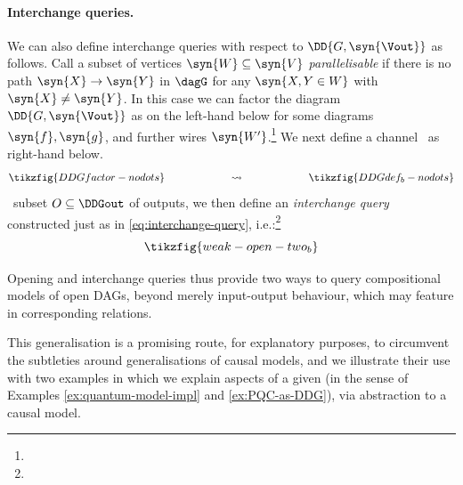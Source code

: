 \documentclass{article}
\begin{document}
\paragraph{Interchange queries.}

We can also define interchange queries with respect to $\DD{G,\syn{\Vout}}$ as follows. Call a subset of vertices $\syn{W} \subseteq \syn{V}$ \emph{parallelisable} if there is no path $\syn{X} \to \syn{Y}$ in $\dagG$ for any $\syn{X, Y \in W}$ with $\syn{X} \neq \syn{Y}$. In this case we can factor the diagram $\DD{G,\syn{\Vout}}$ as on the left-hand below for some diagrams $\syn{f}, \syn{g}$, and further wires $\syn{W'}$.\footnote{} We next define a channel \ as right-hand below.
\[
\tikzfig{DDGfactor-nodots}
\qquad \qquad  \qquad 
\rightsquigarrow
 \qquad \qquad  \qquad 
\tikzfig{DDGdef_b-nodots}
\]
\ subset $O \subseteq \DDGout$ of outputs, we then define an \emph{interchange query} constructed just as in \eqref{eq:interchange-query}, i.e.:\footnote{}
\[
\tikzfig{weak-open-two_b}
\] 

Opening and interchange queries thus provide two ways to query compositional models of open DAGs, beyond merely input-output behaviour, which may feature in corresponding \qdown{} relations. 

This generalisation is a promising route, for explanatory purposes, to circumvent the subtleties around generalisations of causal models, and we illustrate their use with two examples in which we explain aspects of a given \qcircmodel{} (in the sense of Examples \ref{ex:quantum-model-impl} and \ref{ex:PQC-as-DDG}), via abstraction to a causal model.
\end{document}
